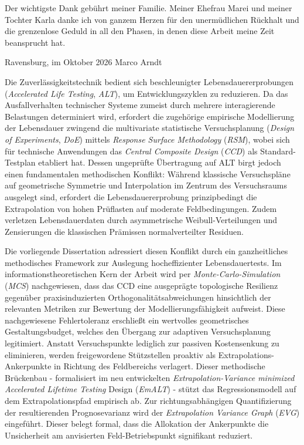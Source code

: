 \documentclass[
 print,%
english, ngerman,%
smallfont, %
twoside, %
toc=bib,
BCOR=6mm, %
]{isw_smb_diss} %
\numberwithin{equation}{chapter} %
\begin{document}
Der wichtigste Dank gebührt meiner Familie.
Meiner Ehefrau Marei und meiner Tochter Karla danke ich von ganzem Herzen für den unermüdlichen Rückhalt und die grenzenlose Geduld in all den Phasen, in denen diese Arbeit meine Zeit beansprucht hat.

\vspace{0.5cm}
\noindent Ravensburg, im Oktober 2026 \hfill Marco Arndt


{}

Die Zuverlässigkeitstechnik bedient sich beschleunigter Lebensdauererprobungen (\textit{Accelerated Life Testing}, \textit{ALT}), um Entwicklungszyklen zu reduzieren. Da das Ausfallverhalten technischer Systeme zumeist durch mehrere interagierende Belastungen determiniert wird, erfordert die zugehörige empirische Modellierung der Lebensdauer zwingend die multivariate statistische Versuchsplanung (\textit{Design of Experiments}, \textit{DoE}) mittels \textit{Response Surface Methodology} (\textit{RSM}), wobei sich für technische Anwendungen das \textit{Central Composite Design} (\textit{CCD}) als Standard-Testplan etabliert hat. Dessen ungeprüfte Übertragung auf ALT birgt jedoch einen fundamentalen methodischen Konflikt: Während klassische Versuchspläne auf geometrische Symmetrie und Interpolation im Zentrum des Versuchsraums ausgelegt sind, erfordert die Lebensdauererprobung prinzipbedingt die Extrapolation von hohen Prüflasten auf moderate Feldbedingungen. Zudem verletzen Lebensdauerdaten durch asymmetrische Weibull-Verteilungen und Zensierungen die klassischen Prämissen normalverteilter Residuen.

Die vorliegende Dissertation adressiert diesen Konflikt durch ein ganzheitliches methodisches Framework zur Auslegung hocheffizienter Lebensdauertests. Im informationstheoretischen Kern der Arbeit wird per \textit{Monte-Carlo-Simulation} (\textit{MCS}) nachgewiesen, dass das CCD eine ausgeprägte topologische Resilienz gegenüber praxisinduzierten Orthogonalitätsabweichungen hinsichtlich der relevanten Metriken zur Bewertung der Modellierungsfähigkeit aufweist. Diese nachgewiesene Fehlertoleranz erschließt ein wertvolles geometrisches Gestaltungsbudget, welches den Übergang zur adaptiven Versuchsplanung legitimiert. Anstatt Versuchspunkte lediglich zur passiven Kostensenkung zu eliminieren, werden freigewordene Stützstellen proaktiv als Extrapolations-Ankerpunkte in Richtung des Feldbereichs verlagert. Dieser methodische Brückenbau - formalisiert im neu entwickelten \textit{Extrapolation-Variance minimized Accelerated Lifetime Testing} Design (\textit{EmALT}) - stützt das Regressionsmodell auf dem Extrapolationspfad empirisch ab. Zur richtungsabhängigen Quantifizierung der resultierenden Prognosevarianz wird der \textit{Extrapolation Variance Graph} (\textit{EVG}) eingeführt. Dieser belegt formal, dass die Allokation der Ankerpunkte die Unsicherheit am anvisierten Feld-Betriebspunkt signifikant reduziert.
\end{document}
